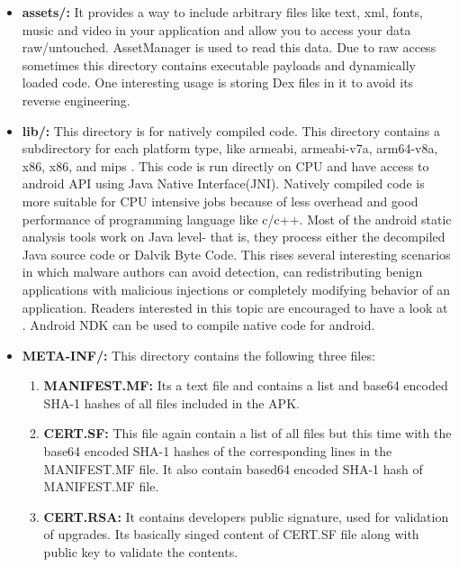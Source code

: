 \documentclass{article}
\begin{document}
				\begin{itemize}
					\item \textbf{assets/:} It provides a way to include arbitrary files like text, xml, fonts, music and video in your application and allow you to access your data raw/untouched. AssetManager is used to read this data\cite{android_assets}. Due to raw access sometimes this directory contains executable payloads and dynamically loaded code. One interesting usage is storing Dex files in it to avoid its reverse engineering. \cite{lim2016android}
					
					\item \textbf{lib/:} This directory is for natively compiled code. This directory contains a subdirectory for each platform type, like armeabi, armeabi-v7a, arm64-v8a, x86, x86, and mips \cite{APK_structure}. This code is run directly on CPU and have access to android API using Java Native Interface(JNI). Natively compiled code is more suitable for CPU intensive jobs because of less overhead and good performance of programming language like c/c++. Most of the android  static analysis tools work on Java level- that is, they process either the decompiled Java source code or Dalvik Byte Code\cite{afonso2016going}. This rises several interesting scenarios in which malware authors can avoid detection, can redistributing benign applications with malicious injections or completely modifying behavior of an application. Readers interested in this topic are encouraged to have a look at \cite{afonso2016going}. Android NDK can be used to compile native code for android. 


					\item \textbf{META-INF/:} This directory contains the following three files:
					\begin{enumerate}
						\item \textbf{MANIFEST.MF:} Its a text file and contains a list and base64 encoded SHA-1 hashes of all files included in the APK.
						\item \textbf{CERT.SF:} This file again contain a list of all files but this time with the base64 encoded SHA-1 hashes of the corresponding lines in the MANIFEST.MF file. It also contain based64 encoded SHA-1 hash of MANIFEST.MF file.
						\item \textbf{CERT.RSA:} It contains developers public signature, used for validation of upgrades. Its basically singed content of CERT.SF file along with public key to validate the contents.
					\end{enumerate}
					

\end{itemize}
\end{document}
